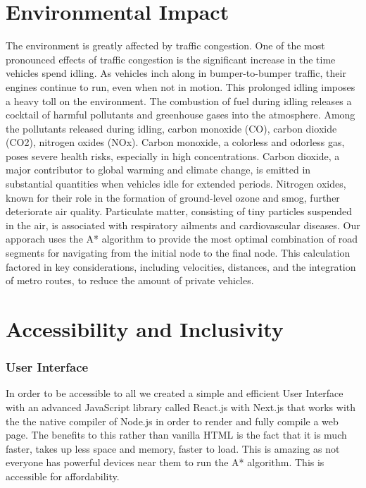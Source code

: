 \documentclass{article}
\begin{document}
\section{Environmental Impact}
The environment is greatly affected by traffic congestion. One of the most pronounced effects of traffic congestion is the significant increase in the time vehicles spend idling. As vehicles inch along in bumper-to-bumper traffic, their engines continue to run, even when not in motion. This prolonged idling imposes a heavy toll on the environment. The combustion of fuel during idling releases a cocktail of harmful pollutants and greenhouse gases into the atmosphere. Among the pollutants released during idling, carbon monoxide (CO), carbon dioxide (CO2), nitrogen oxides (NOx). Carbon monoxide, a colorless and odorless gas, poses severe health risks, especially in high concentrations. Carbon dioxide, a major contributor to global warming and climate change, is emitted in substantial quantities when vehicles idle for extended periods. Nitrogen oxides, known for their role in the formation of ground-level ozone and smog, further deteriorate air quality. Particulate matter, consisting of tiny particles suspended in the air, is associated with respiratory ailments and cardiovascular diseases. Our apporach uses the A* algorithm to provide the most optimal combination of road segments for navigating from the initial node to the final node. This calculation factored in key considerations, including velocities, distances, and the integration of metro routes, to reduce the amount of private vehicles.



\section{Accessibility and Inclusivity}
\subsubsection{User Interface}
In order to be accessible to all we created a simple and efficient User Interface with an advanced JavaScript library called React.js with Next.js that works with the the native compiler of Node.js in order to render and fully compile a web page. The benefits to this rather than vanilla HTML is the fact that it is much faster, takes up less space and memory, faster to load. This is amazing as not everyone has powerful devices near them to run the A* algorithm. This is accessible for affordability. 
\end{document}
